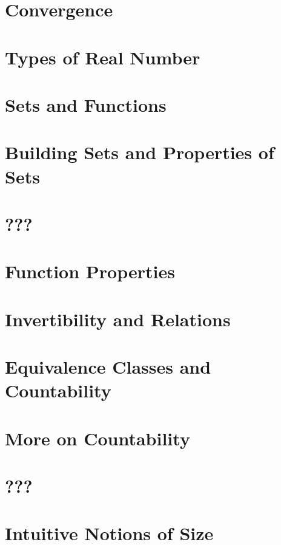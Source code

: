 \documentclass{article}
\begin{document}
\section{Convergence}

\section{Types of Real Number}

\section{Sets and Functions}

\section{Building Sets and Properties of Sets}

\section{???}

\section{Function Properties}

\section{Invertibility and Relations}

\section{Equivalence Classes and Countability}

\section{More on Countability}

\section{???}

\section{Intuitive Notions of Size}

\end{document}
